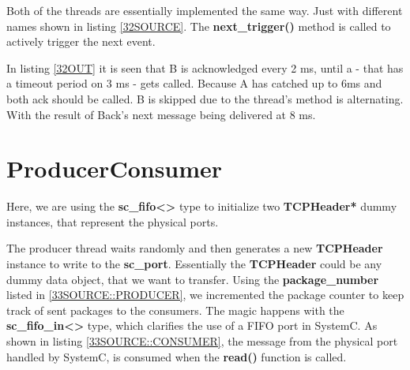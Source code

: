 \documentclass[a4paper,12pt]{report}    %
\begin{document}
Both of the threads are essentially implemented the same way. Just with different names shown in listing \ref{32SOURCE}. The \textbf{next\_trigger()} method is called to actively trigger the next event.

 

In listing \ref{32OUT} it is seen that B is acknowledged every 2 ms, until a - that has a timeout period on 3 ms - gets called. Because A has catched up to 6ms and both ack should be called. B is skipped due to the thread's method is alternating. With the result of Back's next message being delivered at 8 ms.

\lstset{style=output}






\section{ProducerConsumer}

Here, we are using the \textbf{sc\_fifo<>} type to initialize two \textbf{TCPHeader*} dummy instances, that represent the physical ports. 

\lstset{style=code}


The producer thread waits randomly and then generates a new \textbf{TCPHeader} instance to write to the \textbf{sc\_port}. Essentially the \textbf{TCPHeader} could be any dummy data object, that we want to transfer. Using the \textbf{package\_number} listed in \ref{33SOURCE::PRODUCER}, we incremented the package counter to keep track of sent packages to the consumers. The magic happens with the \textbf{sc\_fifo\_in<>} type, which clarifies the use of a FIFO port in SystemC. As shown in listing \ref{33SOURCE::CONSUMER}, the message from the physical port handled by SystemC, is consumed when the \textbf{read()} function is called.


\end{document}
